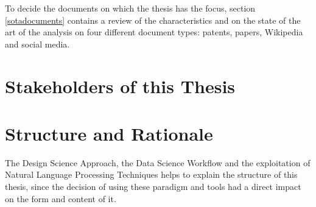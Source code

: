 \documentclass[]{book}
\theoremstyle{definition}
\theoremstyle{definition}
\theoremstyle{definition}
\theoremstyle{remark}
\begin{document}
To decide the documents on which the thesis has the focus, section
\ref{sotadocuments} contains a review of the characteristics and on the
state of the art of the analysis on four different document types:
patents, papers, Wikipedia and social media.

\chapter*{Stakeholders of this
Thesis}\label{stakeholders-of-this-thesis}

\chapter*{Structure and Rationale}\label{structure-and-rationale}

The Design Science Approach, the Data Science Workflow and the
exploitation of Natural Language Processing Techniques helps to explain
the structure of this thesis, since the decision of using these paradigm
and tools had a direct impact on the form and content of it.
\end{document}
